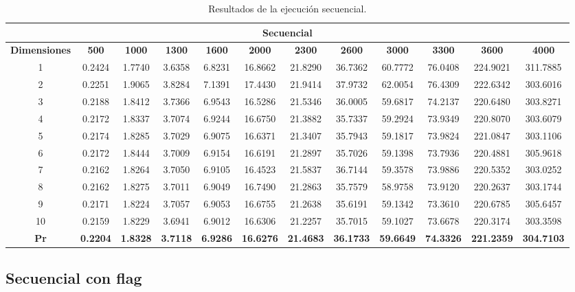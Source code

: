 \documentclass{article}
\begin{document}
\begin{table}[H]
\centering
\tiny
\begin{tabular}{|c|c|c|c|c|c|c|c|c|c|c|c|}
\hline
\multicolumn{12}{|c|}{\textbf{Secuencial}} \\
\hline
\textbf{Dimensiones} & \textbf{500} & \textbf{1000} & \textbf{1300} & \textbf{1600} & \textbf{2000} & \textbf{2300} & \textbf{2600} & \textbf{3000} & \textbf{3300} & \textbf{3600} & \textbf{4000} \\
\hline
1  & 0.2424 & 1.7740 & 3.6358 & 6.8231 & 16.8662 & 21.8290 & 36.7362 & 60.7772 & 76.0408 & 224.9021 & 311.7885 \\
2  & 0.2251 & 1.9065 & 3.8284 & 7.1391 & 17.4430 & 21.9414 & 37.9732 & 62.0054 & 76.4309 & 222.6342 & 303.6016 \\
3  & 0.2188 & 1.8412 & 3.7366 & 6.9543 & 16.5286 & 21.5346 & 36.0005 & 59.6817 & 74.2137 & 220.6480 & 303.8271 \\
4  & 0.2172 & 1.8337 & 3.7074 & 6.9244 & 16.6750 & 21.3882 & 35.7337 & 59.2924 & 73.9349 & 220.8070 & 303.6079 \\
5  & 0.2174 & 1.8285 & 3.7029 & 6.9075 & 16.6371 & 21.3407 & 35.7943 & 59.1817 & 73.9824 & 221.0847 & 303.1106 \\
6  & 0.2172 & 1.8444 & 3.7009 & 6.9154 & 16.6191 & 21.2897 & 35.7026 & 59.1398 & 73.7936 & 220.4881 & 305.9618 \\
7  & 0.2162 & 1.8264 & 3.7050 & 6.9105 & 16.4523 & 21.5837 & 36.7144 & 59.3578 & 73.9886 & 220.5352 & 303.0252 \\
8  & 0.2162 & 1.8275 & 3.7011 & 6.9049 & 16.7490 & 21.2863 & 35.7579 & 58.9758 & 73.9120 & 220.2637 & 303.1744 \\
9  & 0.2171 & 1.8224 & 3.7057 & 6.9053 & 16.6755 & 21.2638 & 35.6191 & 59.1342 & 73.3610 & 220.6785 & 305.6457 \\
10 & 0.2159 & 1.8229 & 3.6941 & 6.9012 & 16.6306 & 21.2257 & 35.7015 & 59.1027 & 73.6678 & 220.3174 & 303.3598 \\
\hline
\textbf{Pr} & \textbf{0.2204} & \textbf{1.8328} & \textbf{3.7118} & \textbf{6.9286} & \textbf{16.6276} & \textbf{21.4683} & \textbf{36.1733} & \textbf{59.6649} & \textbf{74.3326} & \textbf{221.2359} & \textbf{304.7103} \\
\hline
\end{tabular}
\caption{Resultados de la ejecución secuencial.}
\label{tab:secuencial}
\end{table}

\subsection{Secuencial con flag}
\end{document}
